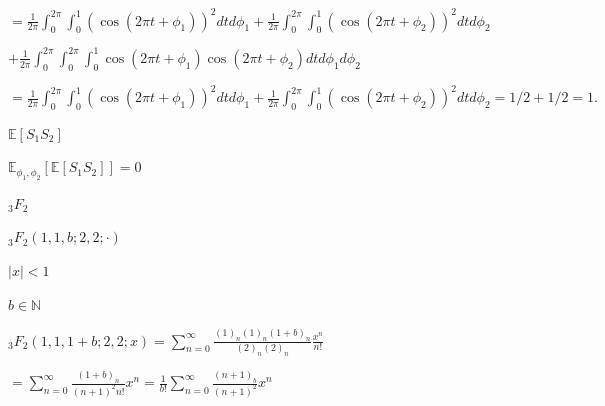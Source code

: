 \documentclass{article}
\def\lthtmlcheckvsize{\ifdim\ht\sizebox<\vsize 
  \ifdim\wd\sizebox<\hsize\expandafter\hfill\fi \expandafter\vfill
  \else\expandafter\vss\fi}%
\begin{document}
{\newpage\clearpage
{}%
$\displaystyle =\frac{1}{2 \pi}\int_0^{2 \pi} \int_0^1 (\cos(2 \pi t + \phi_1))^2dt d \phi_1 + \frac{1}{2 \pi}\int_0^{2 \pi} \int_0^1 ( \cos(2 \pi t + \phi_2))^2dt  d \phi_2$%
\lthtmlindisplaymathZ
\lthtmlcheckvsize\clearpage}

{\newpage\clearpage
{}%
$\displaystyle + \frac{1}{2 \pi}\int_0^{2 \pi} \int_0^{2 \pi}\int_0^1 \cos(2 \pi t + \phi_1) \cos(2 \pi t + \phi_2)dt d \phi_1 d \phi_2$%
\lthtmlindisplaymathZ
\lthtmlcheckvsize\clearpage}

{\newpage\clearpage
{}%
$\displaystyle = \frac{1}{2 \pi}\int_0^{2 \pi} \int_0^1 (\cos(2 \pi t + \phi_1))^2dt d \phi_1  + \frac{1}{2 \pi}\int_0^{2 \pi} \int_0^1 ( \cos(2 \pi t + \phi_2))^2dt  d \phi_2 = 1/2 +1/2 =1.$%
\lthtmlindisplaymathZ
\lthtmlcheckvsize\clearpage}

{\newpage\clearpage
{}%
$ \mathbb{E}[S_1 S_2]$%
\lthtmlindisplaymathZ
\lthtmlcheckvsize\clearpage}

{\newpage\clearpage
{}%
$ \mathbb{E}_{\phi_1,\phi_2} \left[\mathbb{E}\left[ S_1S_2\right]\right] =0$%
\lthtmlindisplaymathZ
\lthtmlcheckvsize\clearpage}

{\newpage\clearpage
{}%
$ _3F_2$%
\lthtmlindisplaymathZ
\lthtmlcheckvsize\clearpage}

{\newpage\clearpage
{}%
$ _3F_2(1,1,b;2,2;\cdot)$%
\lthtmlindisplaymathZ
\lthtmlcheckvsize\clearpage}

{\newpage\clearpage
{}%
$ |x|<1$%
\lthtmlindisplaymathZ
\lthtmlcheckvsize\clearpage}

{\newpage\clearpage
{}%
$ b\in\mathbb{N}$%
\lthtmlindisplaymathZ
\lthtmlcheckvsize\clearpage}

{\newpage\clearpage
{}%
$\displaystyle _3F_2(1,1,1+b;2,2;x)= \sum^{\infty}_{n=0}\frac{(1)_n(1)_n(1+b)_n}{(2)_n(2)_n} \frac{x^n}{n!} \nonumber$%
\lthtmlindisplaymathZ
\lthtmlcheckvsize\clearpage}

{\newpage\clearpage
{}%
$\displaystyle =\sum^{\infty}_{n=0}\frac{(1+b)_n}{(n+1)^2n!}x^n = \frac{1}{b!}\sum^{\infty}_{n=0} \frac{(n+1)_{b}}{(n+1)^2}x^n \nonumber$%
\lthtmlindisplaymathZ
\lthtmlcheckvsize\clearpage}
\end{document}
